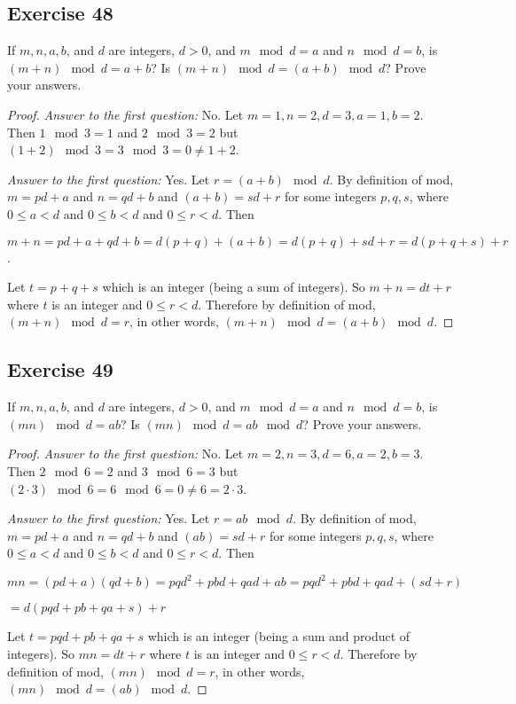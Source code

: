 \documentclass[14pt]{extarticle}
\begin{document}
\subsection{Exercise 48}
If $m, n, a, b$, and $d$ are integers, $d > 0$, and $m \mod d = a$ and $n \mod d = b$, is $(m + n) \mod d = a + b$? Is $(m + n) \mod d = (a + b) \mod d$? Prove your answers.

\begin{proof}
    {\it Answer to the first question:} No. Let $m = 1, n = 2, d = 3, a = 1, b = 2$. Then $1 \mod 3 = 1$ and $2 \mod 3 = 2$ but $(1+2) \mod 3 = 3 \mod 3 = 0 \neq 1+2$.

        {\it Answer to the first question:} Yes. Let $r = (a+b) \mod d$. By definition of mod, $m = pd+a$ and $n = qd+b$ and $(a+b) = sd+r$ for some integers $p,q,s$, where $0 \leq a < d$ and $0 \leq b < d$ and $0 \leq r < d$. Then

    $m+n = pd+a+qd+b = d(p+q)+(a+b) = d(p+q) + sd+r = d(p+q+s)+r$.

    Let $t = p+q+s$ which is an integer (being a sum of integers). So $m+n = dt + r$ where $t$ is an integer and $0 \leq r < d$. Therefore by definition of mod, $(m+n) \mod d = r$, in other words, $(m + n) \mod d = (a + b) \mod d$.
\end{proof}

\subsection{Exercise 49}
If $m, n, a, b$, and $d$ are integers, $d > 0$, and $m \mod d = a$ and $n \mod d = b$, is $(mn) \mod d = ab$? Is $(mn) \mod d = ab \mod d$? Prove your answers.

\begin{proof}
    {\it Answer to the first question:} No. Let $m = 2, n = 3, d = 6, a = 2, b = 3$. Then $2 \mod 6 = 2$ and $3 \mod 6 = 3$ but $(2\cdot3) \mod 6 = 6 \mod 6 = 0 \neq 6 = 2\cdot3$.

        {\it Answer to the first question:} Yes. Let $r = ab \mod d$. By definition of mod, $m = pd+a$ and $n = qd+b$ and $(ab) = sd+r$ for some integers $p,q,s$, where $0 \leq a < d$ and $0 \leq b < d$ and $0 \leq r < d$. Then

    $mn = (pd+a)(qd+b) = pqd^2 + pbd + qad + ab = pqd^2 + pbd + qad + (sd + r)$

    $ = d(pqd+pb+qa+s) + r$

    Let $t = pqd+pb+qa+s$ which is an integer (being a sum and product of integers). So $mn = dt + r$ where $t$ is an integer and $0 \leq r < d$. Therefore by definition of mod, $(mn) \mod d = r$, in other words, $(mn) \mod d = (ab) \mod d$.
\end{proof}
\end{document}

